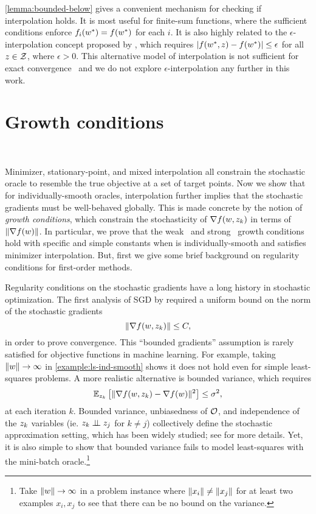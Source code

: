 \autoref{lemma:bounded-below} gives a convenient mechanism for checking if interpolation holds.
It is most useful for finite-sum functions, where the sufficient conditions enforce \( f_i(\wopt) = f(\wopt) \) for each \( i \). 
It is also highly related to the \( \epsilon \)-interpolation concept proposed by \citet{berrada2019training}, which requires \( |f(\wopt, \z) - f(\wopt)| \leq \epsilon \) for all \( z \in \calZ \), where \( \epsilon > 0 \).
This alternative model of interpolation is not sufficient for exact convergence~\citep{berrada2019training} and we do not explore \( \epsilon \)-interpolation any further in this work.

\section{Growth conditions}~\label{sec:growth_conditions}

Minimizer, stationary-point, and mixed interpolation all constrain the stochastic oracle to resemble the true objective at a set of target points. 
Now we show that for individually-smooth oracles, interpolation further implies that the stochastic gradients must be well-behaved globally.
This is made concrete by the notion of \emph{growth conditions}, which constrain the stochasticity of \( \grad(\w, \zk) \) in terms of \( \norm{\grad(\w)} \).
In particular, we prove that the weak~\citep{vaswani2019fast} and strong~\citep{schmidt2011convergence} growth conditions hold with specific and simple constants when \oracle{} is individually-smooth and satisfies minimizer interpolation. 
But, first we give some brief background on regularity conditions for first-order methods.

Regularity conditions on the stochastic gradients have a long history in stochastic optimization. 
The first analysis of \ac{SGD} by \citet{robbins1951sgd} required a uniform bound on the norm of the stochastic gradients
\[ \norm{\grad(\w, \zk)} \leq C, \] 
in order to prove convergence. 
This ``bounded gradients'' assumption is rarely satisfied for objective functions in machine learning.
For example, taking \( \norm{\w} \rightarrow \infty \) in \autoref{example:ls-ind-smooth} shows it does not hold even for simple least-squares problems. 
A more realistic alternative is bounded variance, which requires
\[ \Ek \sbr{\norm{\grad(\w, \zk) - \grad(\w)}^2} \leq \sigma^2, \]
at each iteration \( k \). 
Bounded variance, unbiasedness of \( \oracle{} \), and independence of the \( \zk \) variables (ie. \( \zk \ind \z_j \) for \( k \neq j \)) collectively define the stochastic approximation setting, which has been widely studied; see \citet{kushner1997sa} for more details. 
Yet, it is also simple to show that bounded variance fails to model least-squares with the mini-batch oracle.\footnote{Take \( \norm{\w} \rightarrow \infty \) in a problem instance where \( \norm{x_i} \neq \norm{x_j} \) for at least two examples \( x_i, x_j \) to see that there can be no bound on the variance.} 

